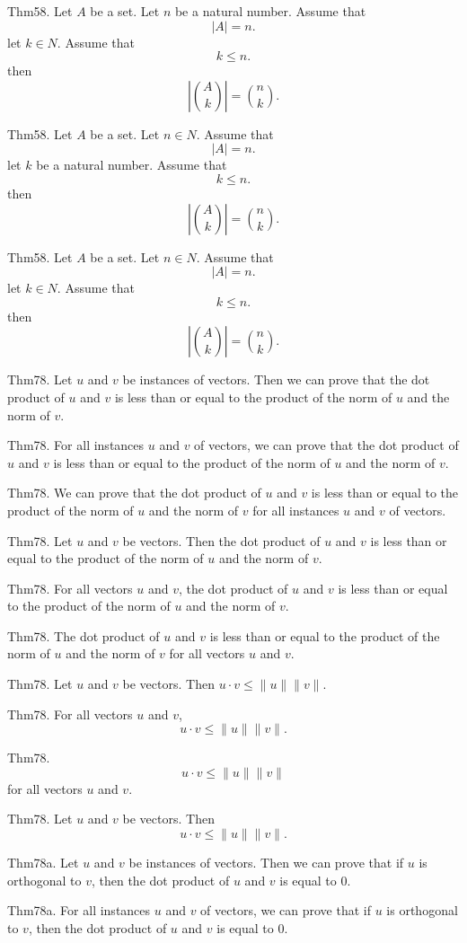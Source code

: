 \documentclass{article}
\begin{document}
Thm58. Let $A$ be a set. Let $n$ be a natural number. Assume that $$| A | = n.$$ let $k \in N$. Assume that $$k \leq n.$$ then $$| \binom{ A }{ k}| = \binom{ n }{ k}.$$

Thm58. Let $A$ be a set. Let $n \in N$. Assume that $$| A | = n.$$ let $k$ be a natural number. Assume that $$k \leq n.$$ then $$| \binom{ A }{ k}| = \binom{ n }{ k}.$$

Thm58. Let $A$ be a set. Let $n \in N$. Assume that $$| A | = n.$$ let $k \in N$. Assume that $$k \leq n.$$ then $$| \binom{ A }{ k}| = \binom{ n }{ k}.$$

Thm78. Let $u$ and $v$ be instances of vectors. Then we can prove that the dot product of $u$ and $v$ is less than or equal to the product of the norm of $u$ and the norm of $v$.

Thm78. For all instances $u$ and $v$ of vectors, we can prove that the dot product of $u$ and $v$ is less than or equal to the product of the norm of $u$ and the norm of $v$.

Thm78. We can prove that the dot product of $u$ and $v$ is less than or equal to the product of the norm of $u$ and the norm of $v$ for all instances $u$ and $v$ of vectors.

Thm78. Let $u$ and $v$ be vectors. Then the dot product of $u$ and $v$ is less than or equal to the product of the norm of $u$ and the norm of $v$.

Thm78. For all vectors $u$ and $v$, the dot product of $u$ and $v$ is less than or equal to the product of the norm of $u$ and the norm of $v$.

Thm78. The dot product of $u$ and $v$ is less than or equal to the product of the norm of $u$ and the norm of $v$ for all vectors $u$ and $v$.

Thm78. Let $u$ and $v$ be vectors. Then $u \cdot v \leq \| u \| \| v \|$.

Thm78. For all vectors $u$ and $v$, $$u \cdot v \leq \| u \| \| v \|.$$

Thm78. $$u \cdot v \leq \| u \| \| v \|$$ for all vectors $u$ and $v$.

Thm78. Let $u$ and $v$ be vectors. Then $$u \cdot v \leq \| u \| \| v \|.$$

Thm78a. Let $u$ and $v$ be instances of vectors. Then we can prove that if $u$ is orthogonal to $v$, then the dot product of $u$ and $v$ is equal to $0$.

Thm78a. For all instances $u$ and $v$ of vectors, we can prove that if $u$ is orthogonal to $v$, then the dot product of $u$ and $v$ is equal to $0$.
\end{document}
